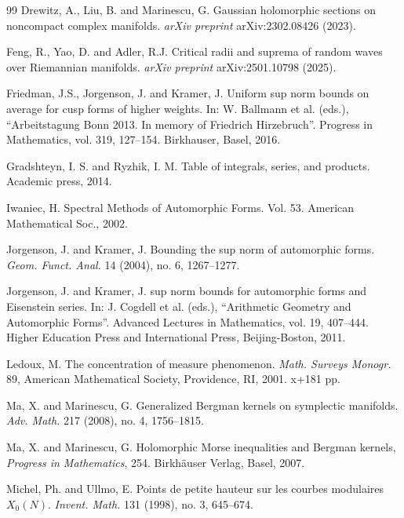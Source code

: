 \documentclass[12pt, a4paper]{amsart}
\theoremstyle{definition}
\newcommand {\1} {\mathbf{1}}
\numberwithin{equation}{section}
\begin{document}
\begin{thebibliography}{99}
Drewitz, A., Liu, B. and Marinescu, G.
Gaussian holomorphic sections on noncompact complex manifolds.
\emph{arXiv preprint} arXiv:2302.08426 (2023).

Feng, R., Yao, D. and Adler, R.J.
Critical radii and suprema of random waves over Riemannian manifolds.
\emph{arXiv preprint} arXiv:2501.10798 (2025).

Friedman, J.S., Jorgenson, J. and Kramer, J.
Uniform sup norm bounds on average for cusp forms of higher weights.
In: W. Ballmann et al. (eds.), ``Arbeitstagung Bonn 2013. In memory of
Friedrich Hirzebruch''. Progress in Mathematics, vol. 319, 127--154. Birkhauser, Basel, 2016.


Gradshteyn, I. S.  and Ryzhik, I. M.
Table of integrals, series, and products.
Academic press, 2014.


Iwaniec, H.
Spectral Methods of Automorphic Forms. Vol. 53.
American Mathematical Soc., 2002.

Jorgenson, J. and Kramer, J.
Bounding the sup norm of automorphic forms.
\emph{Geom. Funct. Anal.} 14 (2004), no. 6, 1267--1277.

Jorgenson, J. and Kramer, J.
sup norm bounds for automorphic forms and Eisenstein series.
In: J. Cogdell et al. (eds.), ``Arithmetic Geometry and Automorphic Forms''. Advanced Lectures
in Mathematics, vol. 19, 407--444. Higher Education Press and International Press, Beijing-Boston, 2011.

Ledoux, M.
The concentration of measure phenomenon.
\emph{Math. Surveys Monogr.} 89, American Mathematical Society,
Providence, RI, 2001. x+181 pp.



Ma, X. and Marinescu, G.
Generalized Bergman kernels on symplectic manifolds.
\emph{Adv. Math.} 217 (2008), no. 4, 1756--1815.

 Ma, X. and Marinescu, G. Holomorphic Morse inequalities and Bergman kernels,
\emph{Progress in Mathematics}, 254. Birkhäuser Verlag, Basel, 2007.

Michel, Ph. and Ullmo, E.
Points de petite hauteur sur les courbes modulaires $X_0(N)$.
\emph{Invent. Math.} 131 (1998), no. 3, 645--674.


\end{thebibliography}
\end{document}
